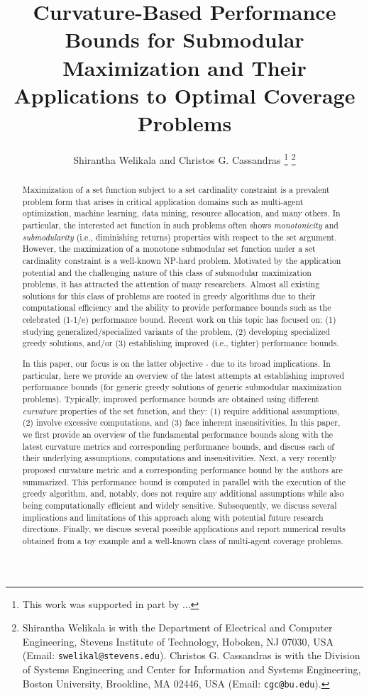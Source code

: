 \documentclass[letterpaper, 10 pt, conference]{ieeeconf}
\title{\LARGE \bf
Curvature-Based Performance Bounds for Submodular Maximization and Their Applications to Optimal Coverage Problems
}
\author{Shirantha Welikala and Christos G. Cassandras %
\thanks{This work was supported in part by ... }
\thanks{Shirantha Welikala is with the Department of Electrical and Computer Engineering, Stevens Institute of Technology, Hoboken, NJ 07030, USA (Email: \texttt{{\small swelikal@stevens.edu}}). Christos G. Cassandras is with the Division of Systems Engineering and Center for Information and Systems Engineering, Boston University, Brookline, MA 02446, USA (Email: \texttt{{\small cgc@bu.edu}}).}}
\begin{document}
\maketitle

\begin{abstract}
Maximization of a set function subject to a set cardinality constraint is a prevalent problem form that arises in critical application domains such as multi-agent optimization, machine learning, data mining, resource allocation, and many others. 
In particular, the interested set function in such problems often shows \emph{monotonicity} and \emph{submodularity} (i.e., diminishing returns) properties with respect to the set argument. 
However, the maximization of a monotone submodular set function under a set cardinality constraint is a well-known NP-hard problem. Motivated by the application potential and the challenging nature of this class of submodular maximization problems, it has attracted the attention of many researchers. Almost all existing solutions for this class of problems are rooted in greedy algorithms due to their computational efficiency and the ability to provide performance bounds such as the celebrated (1-1/e) performance bound. Recent work on this topic has focused on: (1) studying generalized/specialized variants of the problem, (2) developing specialized greedy solutions, and/or (3) establishing improved (i.e., tighter) performance bounds. 

In this paper, our focus is on the latter objective - due to its broad implications. In particular, here we provide an overview of the latest attempts at establishing improved performance bounds (for generic greedy solutions of generic submodular maximization problems). Typically, improved performance bounds are obtained using different \emph{curvature} properties of the set function, and they: (1) require additional assumptions, (2) involve excessive computations, and (3) face inherent insensitivities. 
In this paper, we first provide an overview of the fundamental performance bounds along with the latest curvature metrics and corresponding performance bounds, and discuss each of their underlying assumptions, computations and insensitivities. Next, a very recently proposed curvature metric and a corresponding performance bound by the authors are summarized. This performance bound is computed in parallel with the execution of the greedy algorithm, and, notably, does not require any additional assumptions while also being computationally efficient and widely sensitive. Subsequently, we discuss several implications and limitations of this approach along with potential future research directions. Finally, we discuss several possible applications and report numerical results obtained from a toy example and a well-known class of multi-agent coverage problems. 
\end{abstract}
\end{document}
